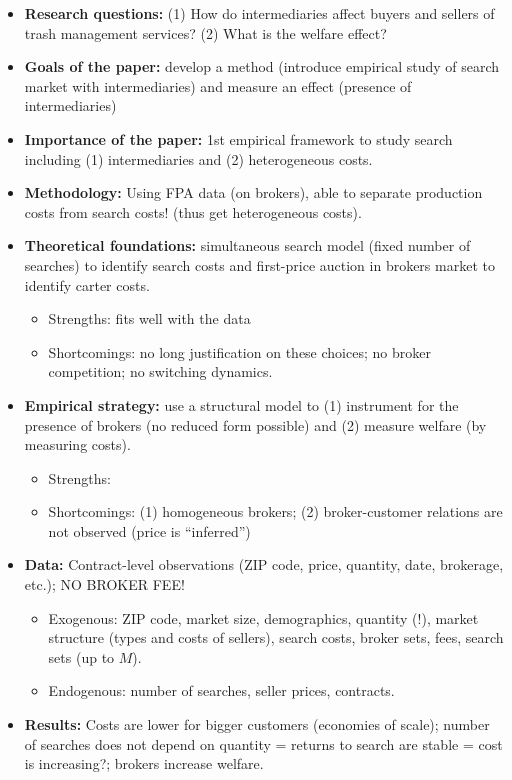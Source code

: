 \begin{itemize}
\item \textbf{Research questions:} (1) How do intermediaries affect buyers and sellers of trash management services? (2) What is the welfare effect?
\item \textbf{Goals of the paper:} develop a method (introduce empirical study of search market with intermediaries) and measure an effect (presence of intermediaries)
\item \textbf{Importance of the paper:} 1st empirical framework to study search including (1) intermediaries and (2) heterogeneous costs.
\item \textbf{Methodology:} Using FPA data (on brokers), able to separate production costs from search costs! (thus get heterogeneous costs).
\item \textbf{Theoretical foundations:}  simultaneous search model (fixed number of searches) to identify search costs and first-price auction in brokers market to identify carter costs. \begin{itemize}
\item Strengths: fits well with the data
\item Shortcomings: no long justification on these choices; no broker competition; no switching dynamics.
\end{itemize}
\item \textbf{Empirical strategy:} use a structural model to (1) instrument for the presence of brokers (no reduced form possible) and (2) measure welfare (by measuring costs).\begin{itemize}
\item Strengths: 
\item Shortcomings: (1) homogeneous brokers; (2) broker-customer relations are not observed (price is ``inferred'')
\end{itemize}
\item \textbf{Data:} Contract-level observations (ZIP code, price, quantity, date, brokerage, etc.); NO BROKER FEE!
\begin{itemize}
\item Exogenous: ZIP code, market size, demographics, quantity (!), market structure (types and costs of sellers), search costs, broker sets, fees, search sets (up to $M$).
\item Endogenous: number of searches, seller prices, contracts.
\end{itemize}
\item \textbf{Results:} Costs are lower for bigger customers (economies of scale); number of searches does not depend on quantity = returns to search are stable = cost is increasing?; brokers increase welfare. 
\end{itemize}
